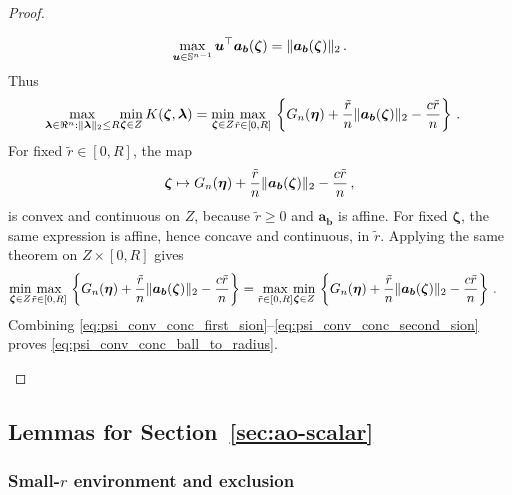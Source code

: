 \documentclass{article}
\makeatletter
\theoremstyle{definition}
\newcommand{\vnorm}[1]{%
	\ensuremath{%
		\if@display
		\left\| #1 \right\|
		\else
		\| #1 \|
		\fi
	}%
}
\newcommand*{\bb}{\boldsymbol}
\def\bu{\bb{u}}
\def\blambda{\bb{\lambda}}
\makeatother
\begin{document}
\begin{bibunit}
\begin{proof}
\begin{enumerate}[label=(\roman*)]
\begin{equation}
		\underset{\bu\in\mathbb S^{n-1}}{\max} \,
		\bu^\top
		\bb a_{\bb b}(\bb\zeta)
		=
		\vnorm{
			\bb a_{\bb b}(\bb\zeta)
		}_2 \,.
	\end{equation}
	Thus
	\begin{equation}
		\label{eq:psi_conv_conc_before_second_sion}
		\begin{aligned}
			&\underset{\blambda\in\Re^n:\vnorm{\blambda}_2\leq R}{\max}
			\underset{\bb\zeta\in Z}{\min} \,
			K(\bb\zeta,\blambda)
			=
			\underset{\bb\zeta\in Z}{\min}
			\underset{\tilde r\in[0,R]}{\max} \,
			\left\{
				G_n(\bb\eta)
				+
				\frac{\tilde r}{n}
				\vnorm{
					\bb a_{\bb b}(\bb\zeta)
				}_2
				-
				\frac{c\tilde r}{n}
			\right\} \,.
		\end{aligned}
	\end{equation}
	For fixed $\tilde r\in[0,R]$, the map
	$$
		\bb\zeta
		\mapsto
		G_n(\bb\eta)
		+
		\frac{\tilde r}{n}
		\vnorm{
			\bb a_{\bb b}(\bb\zeta)
		}_2
		-
		\frac{c\tilde r}{n}\,,
	$$
	is convex and continuous on $Z$, because $\tilde r\geq0$ and $\bb a_{\bb b}$ is affine. For fixed $\bb\zeta$, the same expression is affine, hence concave and continuous, in $\tilde r$. Applying the same theorem on $Z\times[0,R]$ gives
	\begin{equation}
		\label{eq:psi_conv_conc_second_sion}
		\begin{aligned}
			&\underset{\bb\zeta\in Z}{\min}
			\underset{\tilde r\in[0,R]}{\max} \,
			\left\{
				G_n(\bb\eta)
				+
				\frac{\tilde r}{n}
				\vnorm{
					\bb a_{\bb b}(\bb\zeta)
				}_2
				-
				\frac{c\tilde r}{n}
			\right\} 
			=
			\underset{\tilde r\in[0,R]}{\max}
			\underset{\bb\zeta\in Z}{\min} \,
			\left\{
				G_n(\bb\eta)
				+
				\frac{\tilde r}{n}
				\vnorm{
					\bb a_{\bb b}(\bb\zeta)
				}_2
				-
				\frac{c\tilde r}{n}
			\right\} \,.
		\end{aligned}
	\end{equation}
	Combining \eqref{eq:psi_conv_conc_first_sion}--\eqref{eq:psi_conv_conc_second_sion} proves \eqref{eq:psi_conv_conc_ball_to_radius}.
\end{enumerate}
\end{proof}



\subsection{Lemmas for Section~\ref{sec:ao-scalar}}

\subsubsection{Small-$r$ environment and exclusion}
\label{subsec:small_r_exclusion}


\end{bibunit}
\end{document}
